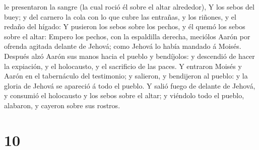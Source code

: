 le presentaron la sangre (la cual roció él sobre el altar alrededor),
 Y los sebos del buey; y del carnero la cola con lo que
cubre las entrañas, y los riñones, y el redaño del hígado: 
Y pusieron los sebos sobre los pechos, y él quemó los sebos sobre el
altar:  Empero los pechos, con la espaldilla derecha,
meciólos Aarón por ofrenda agitada delante de Jehová; como Jehová lo
había mandado á Moisés.  Después alzó Aarón sus manos hacia
el pueblo y bendíjolos: y descendió de hacer la expiación, y el
holocausto, y el sacrificio de las paces.  Y entraron
Moisés y Aarón en el tabernáculo del testimonio; y salieron, y
bendijeron al pueblo: y la gloria de Jehová se apareció á todo el
pueblo.  Y salió fuego de delante de Jehová, y consumió el
holocausto y los sebos sobre el altar; y viéndolo todo el pueblo,
alabaron, y cayeron sobre sus rostros.

\hypertarget{section-9}{%
\section{10}\label{section-9}}

